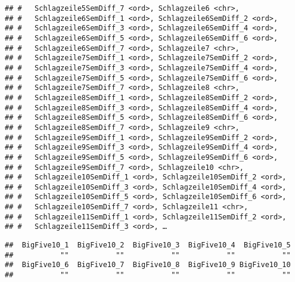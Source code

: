 \documentclass[]{article}
\begin{document}
\begin{verbatim}
## #   Schlagzeile5SemDiff_7 <ord>, Schlagzeile6 <chr>,
## #   Schlagzeile6SemDiff_1 <ord>, Schlagzeile6SemDiff_2 <ord>,
## #   Schlagzeile6SemDiff_3 <ord>, Schlagzeile6SemDiff_4 <ord>,
## #   Schlagzeile6SemDiff_5 <ord>, Schlagzeile6SemDiff_6 <ord>,
## #   Schlagzeile6SemDiff_7 <ord>, Schlagzeile7 <chr>,
## #   Schlagzeile7SemDiff_1 <ord>, Schlagzeile7SemDiff_2 <ord>,
## #   Schlagzeile7SemDiff_3 <ord>, Schlagzeile7SemDiff_4 <ord>,
## #   Schlagzeile7SemDiff_5 <ord>, Schlagzeile7SemDiff_6 <ord>,
## #   Schlagzeile7SemDiff_7 <ord>, Schlagzeile8 <chr>,
## #   Schlagzeile8SemDiff_1 <ord>, Schlagzeile8SemDiff_2 <ord>,
## #   Schlagzeile8SemDiff_3 <ord>, Schlagzeile8SemDiff_4 <ord>,
## #   Schlagzeile8SemDiff_5 <ord>, Schlagzeile8SemDiff_6 <ord>,
## #   Schlagzeile8SemDiff_7 <ord>, Schlagzeile9 <chr>,
## #   Schlagzeile9SemDiff_1 <ord>, Schlagzeile9SemDiff_2 <ord>,
## #   Schlagzeile9SemDiff_3 <ord>, Schlagzeile9SemDiff_4 <ord>,
## #   Schlagzeile9SemDiff_5 <ord>, Schlagzeile9SemDiff_6 <ord>,
## #   Schlagzeile9SemDiff_7 <ord>, Schlagzeile10 <chr>,
## #   Schlagzeile10SemDiff_1 <ord>, Schlagzeile10SemDiff_2 <ord>,
## #   Schlagzeile10SemDiff_3 <ord>, Schlagzeile10SemDiff_4 <ord>,
## #   Schlagzeile10SemDiff_5 <ord>, Schlagzeile10SemDiff_6 <ord>,
## #   Schlagzeile10SemDiff_7 <ord>, Schlagzeile11 <chr>,
## #   Schlagzeile11SemDiff_1 <ord>, Schlagzeile11SemDiff_2 <ord>,
## #   Schlagzeile11SemDiff_3 <ord>, …
\end{verbatim}

\begin{verbatim}
##  BigFive10_1  BigFive10_2  BigFive10_3  BigFive10_4  BigFive10_5 
##           ""           ""           ""           ""           "" 
##  BigFive10_6  BigFive10_7  BigFive10_8  BigFive10_9 BigFive10_10 
##           ""           ""           ""           ""           ""
\end{verbatim}
\end{document}
